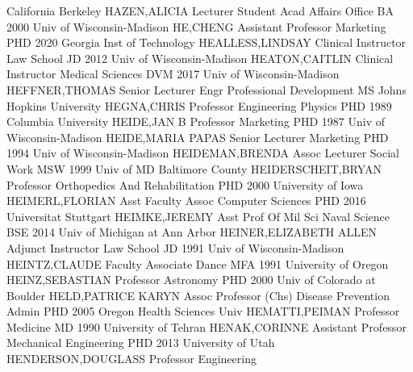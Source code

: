\documentclass[
]{article}
\begin{document}
California Berkeley \textbar{}  \textbar HAZEN,ALICIA
\textbar Lecturer \textbar Student Acad Affairs Office \textbar BA 2000
Univ of Wisconsin-Madison \textbar{}  \textbar HE,CHENG
\textbar Assistant Professor \textbar Marketing \textbar PHD 2020
Georgia Inst of Technology \textbar{} 
\textbar HEALLESS,LINDSAY \textbar Clinical Instructor \textbar Law
School \textbar JD 2012 Univ of Wisconsin-Madison \textbar{}
 \textbar HEATON,CAITLIN \textbar Clinical Instructor
\textbar Medical Sciences \textbar DVM 2017 Univ of Wisconsin-Madison
\textbar{}  \textbar HEFFNER,THOMAS \textbar Senior Lecturer
\textbar Engr Professional Development \textbar MS Johns Hopkins
University \textbar{}  \textbar HEGNA,CHRIS
\textbar Professor \textbar Engineering Physics \textbar PHD 1989
Columbia University \textbar{}  \textbar HEIDE,JAN B
\textbar Professor \textbar Marketing \textbar PHD 1987 Univ of
Wisconsin-Madison \textbar{}  \textbar HEIDE,MARIA PAPAS
\textbar Senior Lecturer \textbar Marketing \textbar PHD 1994 Univ of
Wisconsin-Madison \textbar{}  \textbar HEIDEMAN,BRENDA
\textbar Assoc Lecturer \textbar Social Work \textbar MSW 1999 Univ of
MD Baltimore County \textbar{}  \textbar HEIDERSCHEIT,BRYAN
\textbar Professor \textbar Orthopedics And Rehabilitation \textbar PHD
2000 University of Iowa \textbar{}  \textbar HEIMERL,FLORIAN
\textbar Asst Faculty Assoc \textbar Computer Sciences \textbar PHD 2016
Universitat Stuttgart \textbar{}  \textbar HEIMKE,JEREMY
\textbar Asst Prof Of Mil Sci \textbar Naval Science \textbar BSE 2014
Univ of Michigan at Ann Arbor \textbar{} 
\textbar HEINER,ELIZABETH ALLEN \textbar Adjunct Instructor \textbar Law
School \textbar JD 1991 Univ of Wisconsin-Madison \textbar{}
 \textbar HEINTZ,CLAUDE \textbar Faculty Associate
\textbar Dance \textbar MFA 1991 University of Oregon \textbar{}
 \textbar HEINZ,SEBASTIAN \textbar Professor
\textbar Astronomy \textbar PHD 2000 Univ of Colorado at Boulder
\textbar{}  \textbar HELD,PATRICE KARYN \textbar Assoc
Professor (Chs) \textbar Disease Prevention Admin \textbar PHD 2005
Oregon Health Sciences Univ \textbar{} 
\textbar HEMATTI,PEIMAN \textbar Professor \textbar Medicine \textbar MD
1990 University of Tehran \textbar{}  \textbar HENAK,CORINNE
\textbar Assistant Professor \textbar Mechanical Engineering
\textbar PHD 2013 University of Utah \textbar{} 
\textbar HENDERSON,DOUGLASS \textbar Professor \textbar Engineering
\end{document}
